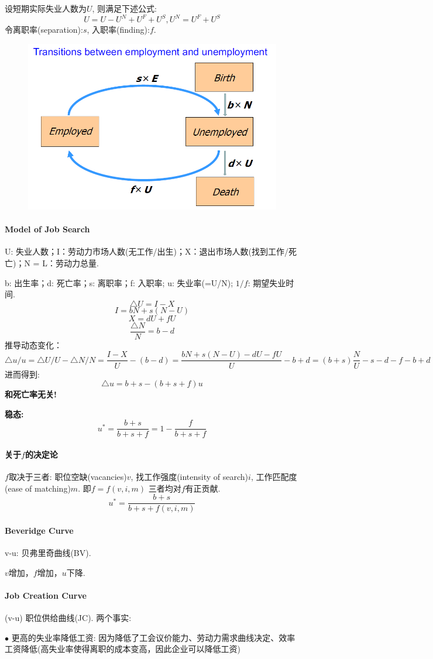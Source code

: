 \documentclass[UTF8, onecolumn, a4paper, 12pt]{article}
\begin{document}
设短期实际失业人数为$U$, 则满足下述公式:
$$U = U - U^N + U^F + U^S, U^N = U^F + U^S$$
令离职率(separation):$s$, 入职率(finding):$f$.
\begin{figure}[htb]
	\centering
	\includegraphics[width=0.5\linewidth]{employ}
\end{figure}
\paragraph{Model of Job Search}
U: 失业人数；I：劳动力市场人数(无工作/出生)；X：退出市场人数(找到工作/死亡)；N = L：劳动力总量.

b: 出生率；d: 死亡率；s: 离职率；f: 入职率; u: 失业率(=U/N); $1/f$: 期望失业时间.
$$\triangle U = I - X$$
$$I = bN + s(N-U)$$
$$X = dU + fU$$
$$\frac{\triangle N}{N} = b - d$$
推导动态变化：
$$\triangle u/u = \triangle U/U - \triangle N/N = \frac{I-X}{U} - (b-d) = \frac{bN + s(N-U) - dU - fU}{U} - b + d = (b+s)\frac{N}{U} -s -d-f-b+d$$
进而得到:
$$\triangle u = b+s - (b+s+f)u$$
\textbf{和死亡率无关!}

\textbf{稳态:}
$$u^* = \frac{b+s}{b+s+f} = 1 - \frac{f}{b+s+f}$$
\paragraph{关于$f$的决定论}
$f$取决于三者: 职位空缺(vacancies)$v$, 找工作强度(intensity of search)$i$, 工作匹配度(ease of matching)$m$. 即$f = f(v, i, m)$
三者均对$f$有正贡献.
$$u^* = \frac{b+s}{b+s + f(v, i, m)}$$
\paragraph{Beveridge Curve}v-u: 贝弗里奇曲线(BV).

$v$增加，$f$增加，$u$下降.
\paragraph{Job Creation Curve}(v-u) 职位供给曲线(JC).
两个事实:

$\bullet$ 更高的失业率降低工资: 因为降低了工会议价能力、劳动力需求曲线决定、效率工资降低(高失业率使得离职的成本变高，因此企业可以降低工资)
\end{document}

